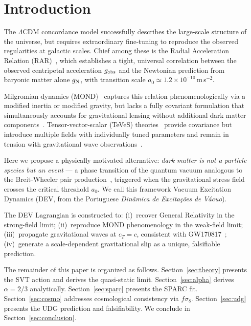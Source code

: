\documentclass[aps,prd,twocolumn,showpacs,superscriptaddress]{revtex4-2}
\newcommand{\aO}{a_0}
\newcommand{\gN}{g_{\rm N}}
\newcommand{\gobs}{g_{\rm obs}}
\newcommand{\LCDM}{$\Lambda$CDM}
\begin{document}
\section{Introduction}
\label{sec:intro}

The \LCDM{} concordance model successfully describes the large-scale
structure of the universe, but requires extraordinary fine-tuning to
reproduce the observed regularities at galactic scales.
Chief among these is the Radial Acceleration Relation
(RAR)~\cite{McGaugh2016}, which establishes a tight, universal
correlation between the observed centripetal acceleration $\gobs$ and
the Newtonian prediction from baryonic matter alone $\gN$,
with transition scale $\aO \simeq 1.2\times10^{-10}$\,m\,s$^{-2}$.

Milgromian dynamics (MOND)~\cite{Milgrom1983} captures this relation
phenomenologically via a modified inertia or modified gravity, but
lacks a fully covariant formulation that simultaneously accounts for
gravitational lensing without additional dark matter
components~\cite{Clowe2006}.
Tensor-vector-scalar (TeVeS) theories~\cite{Bekenstein2004}
provide covariance but introduce multiple fields with individually
tuned parameters and remain in tension with gravitational wave
observations~\cite{GW170817}.

Here we propose a physically motivated alternative:
\emph{dark matter is not a particle species but an event} —
a phase transition of the quantum vacuum analogous to the
Breit-Wheeler pair production~\cite{BreitWheeler1934},
triggered when the gravitational stress field crosses the
critical threshold $\aO$.
We call this framework Vacuum Excitation Dynamics (DEV,
from the Portuguese \emph{Din\^amica de Excita\c{c}\~oes de V\'acuo}).

The DEV Lagrangian is constructed to:
(i)~recover General Relativity in the strong-field limit;
(ii)~reproduce MOND phenomenology in the weak-field limit;
(iii)~propagate gravitational waves at $c_T = c$, consistent with
     GW170817~\cite{GW170817};
(iv)~generate a scale-dependent gravitational slip as a
     unique, falsifiable prediction.

The remainder of this paper is organized as follows.
Section~\ref{sec:theory} presents the SVT action and derives the
quasi-static limit.
Section~\ref{sec:alpha} derives $\alpha = 2/3$ analytically.
Section~\ref{sec:sparc} presents the SPARC fit.
Section~\ref{sec:cosmo} addresses cosmological consistency via $f\sigma_8$.
Section~\ref{sec:udg} presents the UDG prediction and falsifiability.
We conclude in Section~\ref{sec:conclusion}.
\end{document}
